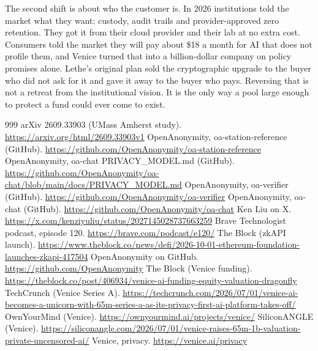 \documentclass[10pt,a4paper]{article}
\begin{document}
The second shift is about who the customer is. In 2026 institutions told the market what they want: custody, audit trails and provider-approved zero retention. They got it from their cloud provider and their lab at no extra cost. Consumers told the market they will pay about \$18 a month for AI that does not profile them, and Venice turned that into a billion-dollar company on policy promises alone. Lethe's original plan sold the cryptographic upgrade to the buyer who did not ask for it and gave it away to the buyer who pays. Reversing that is not a retreat from the institutional vision. It is the only way a pool large enough to protect a fund could ever come to exist.

\begin{thebibliography}{999}
 arXiv 2609.33903 (UMass Amherst study). \url{https://arxiv.org/html/2609.33903v1}
 OpenAnonymity, oa-station-reference (GitHub). \url{https://github.com/OpenAnonymity/oa-station-reference}
 OpenAnonymity, oa-chat PRIVACY\_MODEL.md (GitHub). \url{https://github.com/OpenAnonymity/oa-chat/blob/main/docs/PRIVACY_MODEL.md}
 OpenAnonymity, oa-verifier (GitHub). \url{https://github.com/OpenAnonymity/oa-verifier}
 OpenAnonymity, oa-chat (GitHub). \url{https://github.com/OpenAnonymity/oa-chat}
 Ken Liu on X. \url{https://x.com/kenziyuliu/status/2027145028737663259}
 Brave Technologist podcast, episode 120. \url{https://brave.com/podcast/e120/}
 The Block (zkAPI launch). \url{https://www.theblock.co/news/defi/2026-10-01-ethereum-foundation-launches-zkapi-417504}
 OpenAnonymity on GitHub. \url{https://github.com/OpenAnonymity}
 The Block (Venice funding). \url{https://theblock.co/post/406934/venice-ai-funding-equity-valuation-dragonfly}
 TechCrunch (Venice Series A). \url{https://techcrunch.com/2026/07/01/venice-ai-becomes-a-unicorn-with-65m-series-a-as-its-privacy-first-ai-platform-takes-off/}
 OwnYourMind (Venice). \url{https://ownyourmind.ai/projects/venice/}
 SiliconANGLE (Venice). \url{https://siliconangle.com/2026/07/01/venice-raises-65m-1b-valuation-private-uncensored-ai/}
 Venice, privacy. \url{https://venice.ai/privacy}

\end{thebibliography}
\end{document}
